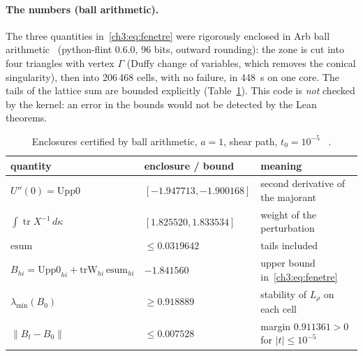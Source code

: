 \paragraph{The numbers \tierC{} (ball arithmetic).} The three quantities in~\eqref{ch3:eq:fenetre} were rigorously
enclosed in Arb ball arithmetic~\cite{ch3-arb} (python-flint 0.6.0, 96 bits, outward rounding): the
zone is cut into four triangles with vertex $\Gamma$ (Duffy change of variables, which removes the conical
singularity), then into 206\,468 cells, with no failure, in 448~s on one core. The tails of the lattice sum are
bounded explicitly (Table~\ref{ch3:tab:boules}). This code is \emph{not} checked by the kernel: an error in the
bounds would not be detected by the Lean theorems.
\begin{table}[ht]\centering\small
\caption{Enclosures certified by ball arithmetic, $a=1$, shear path, $t_0=10^{-5}$
\tierC~\cite{ch3-b2}.}\label{ch3:tab:boules}
\begin{tabular}{lll}\toprule
quantity & enclosure / bound & meaning\\\midrule
$U''(0)=\mathrm{Upp0}$ & $[-1.947713, -1.900168]$ & second derivative of the majorant\\
$\int\operatorname{tr}X^{-1}\,d\kappa$ & $[1.825520, 1.833534]$ & weight of the perturbation\\
$\mathrm{esum}$ & $\le0.0319642$ & tails included\\
$B_{hi}=\mathrm{Upp0}_{hi}+\mathrm{trW}_{hi}\,\mathrm{esum}_{hi}$ & $-1.841560$ & upper bound in~\eqref{ch3:eq:fenetre}\\
$\lambda_{\min}(B_0)$ & $\ge0.918889$ & stability of $L_\rho$ on each cell\\
$\|B_t-B_0\|$ & $\le0.007528$ & margin $0.911361>0$ for $|t|\le10^{-5}$\\
\bottomrule\end{tabular}
\end{table}

